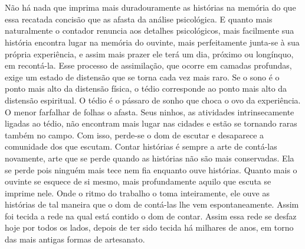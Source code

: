 \section{}

Não há nada que imprima mais duradouramente as histórias na memória do
que essa recatada concisão que as afasta da análise psicológica. E
quanto mais naturalmente o contador renuncia aos detalhes psicológicos,
mais facilmente sua história encontra lugar na memória do ouvinte, mais
perfeitamente junta-se à sua própria experiência, e assim mais prazer
ele terá um dia, próximo ou longínquo, em recontá-la. Esse processo de
assimilação, que ocorre em camadas profundas, exige um estado de
distensão que se torna cada vez mais raro. Se o sono é o ponto mais alto
da distensão física, o tédio corresponde ao ponto mais alto da distensão
espiritual. O tédio é o pássaro de sonho que choca o ovo da experiência\label{supra6}.
O menor farfalhar de folhas o afasta. Seus ninhos, as atividades
intrinsecamente ligadas ao tédio, não encontram mais lugar nas cidades e
estão se tornando raras também no campo. Com isso, perde-se o dom de
escutar e desaparece a comunidade dos que escutam. Contar histórias é
sempre a arte de contá-las novamente, arte que se perde quando as
histórias não são mais conservadas. Ela se perde pois ninguém mais tece
nem fia enquanto ouve histórias. Quanto mais o ouvinte se esquece de si
mesmo, mais profundamente aquilo que escuta se imprime nele. Onde o
ritmo do trabalho o toma inteiramente, ele ouve as histórias de tal
maneira que o dom de contá-las lhe vem espontaneamente. Assim foi tecida
a rede na qual está contido o dom de contar. Assim essa rede se desfaz
hoje por todos os lados, depois de ter sido tecida há milhares de anos,
em torno das mais antigas formas de artesanato.

\section{}

